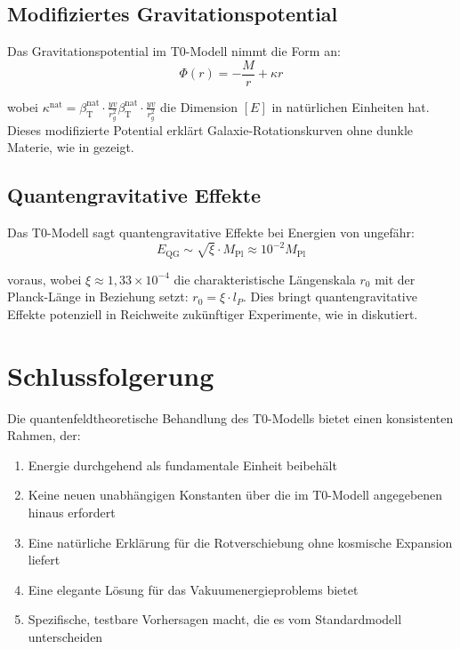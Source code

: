 \documentclass[12pt,a4paper]{article}
\newcommand{\betaT}{\beta_{\text{T}}}
\begin{document}
	\subsection{Modifiziertes Gravitationspotential}
	\label{subsec:potential_prediction}
	
	Das Gravitationspotential im T0-Modell nimmt die Form an:
	\begin{equation}
		\Phi(r) = -\frac{M}{r} + \kappa r
		\label{eq:grav_potential}
	\end{equation}
	
	wobei $\kappa^{\text{nat}} = \betaT^{\text{nat}} \cdot \frac{yv}{r_g^2}\betaT^{\text{nat}} \cdot \frac{yv}{r_g^2}$ die Dimension $[E]$ in natürlichen Einheiten hat. Dieses modifizierte Potential erklärt Galaxie-Rotationskurven ohne dunkle Materie, wie in \cite{Pascher2025Galaxies} gezeigt.
	
	\subsection{Quantengravitative Effekte}
	\label{subsec:quantum_gravity}
	
	Das T0-Modell sagt quantengravitative Effekte bei Energien von ungefähr:
	\begin{equation}
		E_{\text{QG}} \sim \sqrt{\xi} \cdot M_{\text{Pl}} \approx 10^{-2} M_{\text{Pl}}
		\label{eq:quantum_gravity_scale}
	\end{equation}
	
	voraus, wobei $\xi \approx 1,33 \times 10^{-4}$ die charakteristische Längenskala $r_0$ mit der Planck-Länge in Beziehung setzt: $r_0 = \xi \cdot l_P$. Dies bringt quantengravitative Effekte potenziell in Reichweite zukünftiger Experimente, wie in \cite{Pascher2025Planck} diskutiert.
	
	\section{Schlussfolgerung}
	\label{sec:conclusion}
	
	Die quantenfeldtheoretische Behandlung des T0-Modells bietet einen konsistenten Rahmen, der:
	
	\begin{enumerate}
		\item Energie durchgehend als fundamentale Einheit beibehält
		\item Keine neuen unabhängigen Konstanten über die im T0-Modell angegebenen hinaus erfordert
		\item Eine natürliche Erklärung für die Rotverschiebung ohne kosmische Expansion liefert
		\item Eine elegante Lösung für das Vakuumenergieproblems bietet
		\item Spezifische, testbare Vorhersagen macht, die es vom Standardmodell unterscheiden
	\end{enumerate}
	
\end{document}
